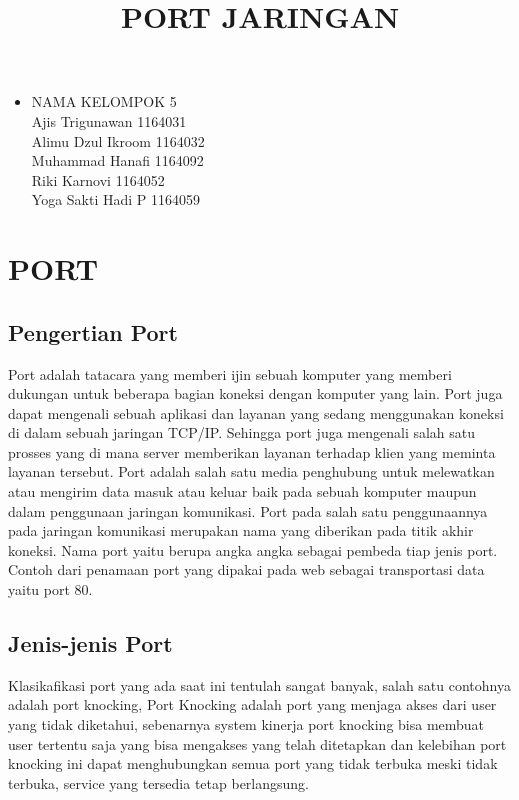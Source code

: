 \documentclass[12pt,a4paper]{article}
\begin{document}
\title{PORT JARINGAN}
\date{}
\maketitle

\begin{itemize}
\item
NAMA KELOMPOK 5\\
Ajis Trigunawan			1164031\\
Alimu Dzul Ikroom		1164032\\
Muhammad Hanafi			1164092\\
Riki Karnovi			1164052\\
Yoga Sakti Hadi P		1164059\\
\end{itemize}

\section{PORT}
\subsection{Pengertian Port}
\hspace{1cm}
Port adalah tatacara yang memberi ijin sebuah komputer yang memberi dukungan untuk beberapa bagian koneksi dengan komputer yang lain. Port juga dapat mengenali sebuah aplikasi dan layanan yang sedang menggunakan koneksi di dalam sebuah jaringan TCP/IP. Sehingga port juga mengenali salah satu prosses yang di mana server memberikan layanan terhadap klien yang meminta layanan tersebut. Port adalah salah satu media penghubung untuk melewatkan atau mengirim data masuk atau keluar baik pada sebuah komputer maupun dalam penggunaan jaringan komunikasi. Port pada salah satu penggunaannya pada jaringan komunikasi merupakan nama yang diberikan pada titik akhir koneksi. Nama port yaitu berupa angka angka sebagai pembeda tiap  jenis port. Contoh dari penamaan port yang dipakai pada web sebagai transportasi data yaitu port 80.

\subsection{Jenis-jenis Port}
\hspace{1cm}
Klasikafikasi port yang ada saat ini tentulah sangat banyak, salah satu contohnya adalah port knocking, Port Knocking adalah port yang menjaga akses  dari user yang tidak diketahui, sebenarnya system kinerja port knocking bisa membuat user tertentu saja yang bisa mengakses yang telah ditetapkan dan kelebihan port knocking ini dapat menghubungkan semua port yang tidak terbuka meski tidak terbuka, service yang tersedia tetap berlangsung.
\end{document}
